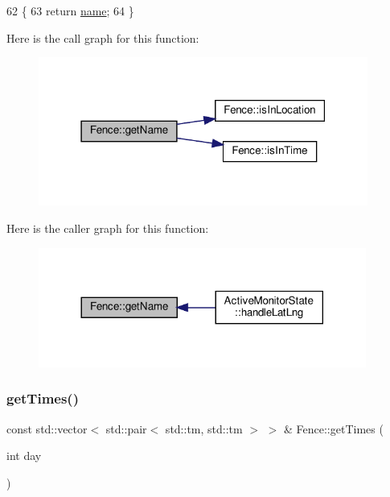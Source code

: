 \begin{DoxyCode}
62 \{
63     \textcolor{keywordflow}{return} \hyperlink{class_fence_aa405676733f25812b38ea0dd9ccd1863}{name};
64 \}
\end{DoxyCode}
Here is the call graph for this function\+:\nopagebreak
\begin{figure}[H]
\begin{center}
\leavevmode
\includegraphics[width=307pt]{d0/db8/class_fence_a1d90d0ff61bec6cda8240f6365fc5d28_cgraph}
\end{center}
\end{figure}
Here is the caller graph for this function\+:\nopagebreak
\begin{figure}[H]
\begin{center}
\leavevmode
\includegraphics[width=305pt]{d0/db8/class_fence_a1d90d0ff61bec6cda8240f6365fc5d28_icgraph}
\end{center}
\end{figure}
\mbox{\label{class_fence_a818ee0fcbac0c2f9262a48916a79d73c}} 
\subsubsection{\texorpdfstring{get\+Times()}{getTimes()}}
{\footnotesize\ttfamily const std\+::vector$<$ std\+::pair$<$ std\+::tm, std\+::tm $>$ $>$ \& Fence\+::get\+Times (\begin{DoxyParamCaption}\item[{int}]{day }\end{DoxyParamCaption})}



